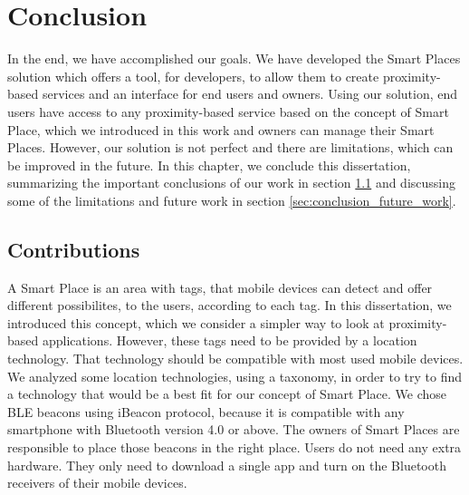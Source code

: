 
\chapter{Conclusion}
\label{chapter:conclusion}
In the end, we have accomplished our goals.
We have developed the Smart Places solution which offers a tool, for developers, to allow them to create proximity-based services and an interface for end users and owners.
Using our solution, end users have access to any proximity-based service based on the concept of Smart Place, which we introduced in this work and owners can manage their Smart Places.
However, our solution is not perfect and there are limitations, which can be improved in the future.
In this chapter, we conclude this dissertation, summarizing the important conclusions of our work in section \ref{sec:conclusion_contributions} and discussing some of the limitations and future work in section \ref{sec:conclusion_future_work}.

\section{Contributions}
\label{sec:conclusion_contributions}
A Smart Place is an area with tags, that mobile devices can detect and offer different possibilites, to the users, according to each tag.
In this dissertation, we introduced this concept, which we consider a simpler way to look at proximity-based applications.
However, these tags need to be provided by a location technology.
That technology should be compatible with most used mobile devices.
We analyzed some location technologies, using a taxonomy\cite{location}, in order to try to find a technology that would be a best fit for our concept of Smart Place.
We chose \gls{BLE} beacons using iBeacon protocol, because it is compatible with any smartphone with Bluetooth version 4.0 or above.
The owners of Smart Places are responsible to place those beacons in the right place.
Users do not need any extra hardware.
They only need to download a single app and turn on the Bluetooth receivers of their mobile devices.

